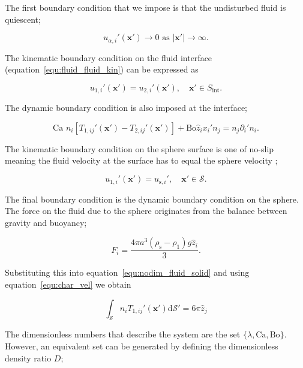 \documentclass[12pt]{article}
\begin{document}
The first boundary condition that we impose is that the undisturbed fluid is quiescent;

\begin{equation}
\label{equ:BC_inf}
u_{\alpha, i}'(\boldsymbol{x'}) \to 0 \text{ as } |\boldsymbol{x'}| \to \infty.
\end{equation}

The kinematic boundary condition on the fluid interface (equation~\ref{equ:fluid_fluid_kin}) can be expressed as  

\begin{equation}
\label{equ:BC_kin_int_nodim}
u_{1,i}'(\boldsymbol{x'}) = u_{2,i}'(\boldsymbol{x'}), \quad \boldsymbol{x'} \in S_{\text{int}}.
\end{equation}

The dynamic boundary condition is also imposed at the interface;

\begin{equation}
\label{equ:BC_dyn_int}
\text{Ca } n_{i} [T_{1, ij}'(\boldsymbol{x'}) - T_{2,ij}'(\boldsymbol{x'})] + \text{Bo} \hat{z}_{i} x_{i}' n_{j} = n_{j} \partial_{i}' n_{i}.
\end{equation}

The kinematic boundary condition on the sphere surface is one of no-slip meaning the fluid velocity at the surface has to equal the sphere velocity ;

\begin{equation}
\label{equ:BC_kin_spere}
u_{1,i}'(\boldsymbol{x'}) = u_{\text{s},i}', \quad \boldsymbol{x'} \in \mathcal{S}.
\end{equation}

The final boundary condition is the dynamic boundary condition on the sphere. The force on the fluid due to the sphere originates from the balance between gravity and buoyancy;

\begin{equation}
\label{equ:sphere_force}
F_{i} = \frac{4 \pi a^{3} (\rho_{\text{s}} - \rho_{1}) g \hat{z}_{i}}{3}.
\end{equation}

Substituting this into equation~\ref{equ:nodim_fluid_solid} and using equation~\ref{equ:char_vel} we obtain

\begin{equation}
\label{equ:BC_dyn_sphere}
\int_{\mathcal{S}} n_{i} T_{1, ij}'(\boldsymbol{x'}) \mathrm{d} \mathcal{S}' = 6 \pi \hat{z}_{j}
\end{equation}

The dimensionless numbers that describe the system are the set $\{\lambda, \text{Ca}, \text{Bo}\}$. However, an equivalent set can be generated by defining the dimensionless density ratio $D$;
\end{document}
